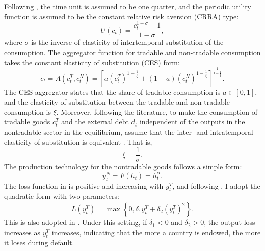 Following \citet{Na-18}, the time unit is assumed to be one quarter, and the periodic utility function is assumed to be the constant relative risk aversion (CRRA) type:
\begin{equation}
    \label{eq:CRRA-utility}
    U(c_t) = \frac{c_t^{1-\sigma} - 1}{1 - \sigma},
\end{equation}
where $\sigma$ is the inverse of elasticity of intertemporal substitution of the consumption.
The aggregator function for tradable and non-tradable consumption takes the constant elasticity of substitution (CES) form:
\begin{equation}
    \label{eq:aggregator-function}
    c_t = A(c^T_t, c^N_t) =
        \left[ a \left( c^T_t \right)^{1- \frac{1}{\xi}} +
            (1 - a) \left( c^N_t \right)^{1- \frac{1}{\xi}}
        \right]^{\frac{1}{1 - \frac{1}{\xi}}}.
\end{equation}
The CES aggregator states that the share of tradable consumption is $a \in [0,1]$, and the elasticity of substitution between the tradable and non-tradable consumption is $\xi$.
Moreover, following the literature, to make the consumption of tradable goods $c^T_t$ and the external debt $d_t$ independent of the outputs in the nontradable sector in the equilibrium,
assume that the inter- and intratemporal elasticity of substitution is equivalent \citep*[see][Chapter 9.5]{Uribe-Schmitt-Grohe-textbook}.
That is,
\begin{equation}
    \label{eq:xi-sigma}
    \xi = \frac{1}{\sigma}.
\end{equation}
The production technology for the nontradable goods follows a simple form:
\begin{equation}
    \label{eq:production-function}
    y^N_t = F(h_t) = h_t ^\alpha.
\end{equation}
The loss-function in  is positive and increasing with $y^T_t$, and following \citet{Chatterjee-12}, I adopt the quadratic form with two parameters:
\begin{equation}
    L(y^T_t) = \max \left\{
        0, \delta_1 y^T_t + \delta_2 \left( y^T_t \right)^2
     \right\}.
\end{equation}
This is also adopted in \citet{Na-18}. Under this setting, if $\delta_1 < 0$ and $\delta_2 >0$, the output-loss increases as $y^T_t$ increases, indicating that the more a country is endowed, the more it loses during default.